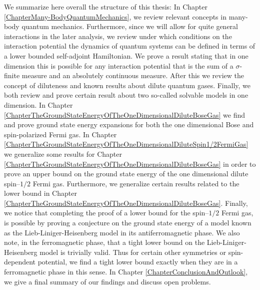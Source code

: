We summarize here overall the structure of this thesis: In Chapter \ref{ChapterMany-BodyQuantumMechanics}, we review relevant concepts in many-body quantum mechanics. Furthermore, since we will allow for quite general interactions in the later analysis, we review under which conditions on the interaction potential the dynamics of quantum systems can be defined in terms of a lower bounded self-adjoint Hamiltonian. We prove a result stating that in one dimension this is possible for any interaction potential that is the sum of a $ \sigma $-finite measure and an absolutely continuous measure. After this we review the concept of diluteness and known results about dilute quantum gases. Finally, we both review and prove certain result about two so-called solvable models in one dimension. In Chapter \ref{ChapterTheGroundStateEnergyOfTheOneDimensionalDiluteBoseGas} we find and prove ground state energy expansions for both the one dimensional Bose and spin-polarized Fermi gas. In Chapter \ref{ChapterTheGroundStateEnergyOfTheOneDimensionalDiluteSpin1/2FermiGas} we generalize some results for Chapter \ref{ChapterTheGroundStateEnergyOfTheOneDimensionalDiluteBoseGas} in order to prove an upper bound on the ground state energy of the one dimensional dilute spin--$ 1/2 $ Fermi gas. Furthermore, we generalize certain results related to the lower bound in Chapter \ref{ChapterTheGroundStateEnergyOfTheOneDimensionalDiluteBoseGas}. Finally, we notice that completing the proof of a lower bound for the spin--$ 1/2 $ Fermi gas, is possible by proving a conjecture on the ground state energy of a model known as the Lieb-Liniger-Heisenberg model in its antiferromagnetic phase. We also note, in the ferromagnetic phase, that a tight lower bound on the Lieb-Liniger-Heisenberg model is trivially valid. Thus for certain other symmetries or spin-dependent potential, we find a tight lower bound exactly when they are in a ferromagnetic phase in this sense.
In Chapter \ref{ChapterConclusionAndOutlook}, we give a final summary of our findings and discuss open problems.

